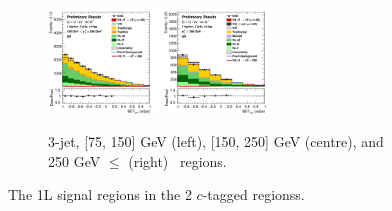 \begin{figure}[h!]
\begin{subfigure}[b]{\textwidth}
        \includegraphics[width=0.32\textwidth]{Images/VH/Own_fit/postfit_VHcc/Region_distmva_BMax250_BMin150_DSR_J3_TTypext_T2_L1_Y6051_GlobalFit_conditionnal_mu1.png}
        \includegraphics[width=0.32\textwidth]{Images/VH/Own_fit/postfit_VHcc/Region_distmva_BMin250_DSR_J3_TTypext_T2_L1_Y6051_GlobalFit_conditionnal_mu1.png}
        \caption{3-jet, [75, 150] GeV (left), [150, 250] GeV (centre), and 250  GeV $\leq$ (right) \ptv\ regions.}
        \label{fig:plots_VHcc_1L_SR_3J_2c}
    \end{subfigure}
    \caption{The 1L signal regions in the 2 $c$-tagged regionss.}
    \label{fig:plots_VHcc_1L_SR_2c}
\end{figure}
